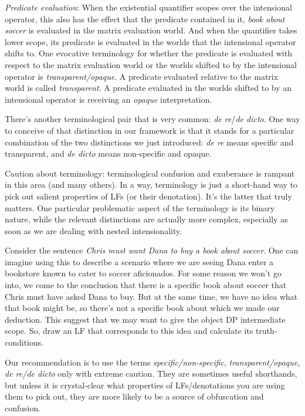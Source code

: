 \emph{Predicate evaluation}: When the existential quantifier scopes over the
intensional operator, this also has the effect that the predicate contained in
it, \emph{book about soccer} is evaluated in the matrix evaluation world. And
when the quantifier takes lower scope, its predicate is evaluated in the worlds
that the intensional operator shifts to. One evocative terminology for whether
the predicate is evaluated with respect to the matrix evaluation world or the
worlds shifted to by the intensional operator is \emph{transparent/opaque}. A
predicate evaluated relative to the matrix world is called \emph{transparent}. A
predicate evaluated in the worlds shifted to by an intensional operator is
receiving an \emph{opaque} interpretation.

There's another terminological pair that is very common: \emph{de re}/\emph{de
  dicto}. One way to conceive of that distinction in our framework is that it
stands for a particular combination of the two distinctions we just introduced:
\emph{de re} means specific and transparent, and \emph{de dicto} means
non-specific and opaque.

Caution about terminology: terminological confusion and exuberance is rampant in
this area (and many others). In a way, terminology is just a short-hand way to
pick out salient properties of LFs (or their denotation). It's the latter that
truly matters. One particular problematic aspect of the terminology is its
binary nature, while the relevant distinctions are actually more complex,
especially as soon as we are dealing with nested intensionality.

\begin{exercise}
  Consider the sentence \emph{Chris must want Dana to buy a book about soccer}.
  One can imagine using this to describe a scenario where we are seeing Dana
  enter a bookstore known to cater to soccer aficionados. For some reason we
  won't go into, we come to the conclusion that there is a specific book about
  soccer that Chris must have asked Dana to buy. But at the same time, we have
  no idea what that book might be, so there's not a specific book about which we
  made our deduction. This suggest that we may want to give the object DP
  intermediate scope. So, draw an LF that corresponds to this idea and calculate
  its truth-conditions.
\end{exercise}

Our recommendation is to use the terms \emph{specific/non-specific},
\emph{transparent/opaque}, \emph{de re/de dicto} only with extreme caution. They
are sometimes useful shorthands, but unless it is crystal-clear what properties
of LFs/denotations you are using them to pick out, they are more likely to be a
source of obfuscation and confusion.



